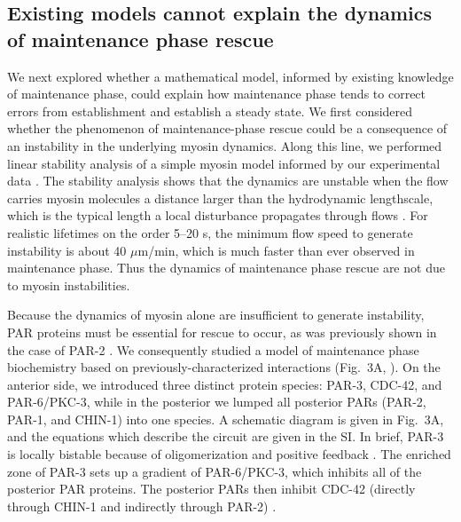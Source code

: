 \documentclass[11pt]{article}
\newcommand{\6}[1]{#1_{\text{6}}}
\newcommand{\3}[1]{#1_{\text{3}}}
\begin{document}
\subsection*{Existing models cannot explain the dynamics of maintenance phase rescue }
We next explored whether a mathematical model, informed by existing knowledge of maintenance phase, could explain how maintenance phase tends to correct errors from establishment and establish a steady state. We first considered whether the phenomenon of maintenance-phase rescue could be a consequence of an instability in the underlying myosin dynamics. Along this line, we performed linear stability analysis of a simple myosin model informed by our experimental data \citep{mayer2010anisotropies, bois2011pattern}. The stability analysis shows that the dynamics are unstable when the flow carries myosin molecules a distance larger than the hydrodynamic lengthscale, which is the typical length a local disturbance propagates through flows \citep{mayer2010anisotropies}. For realistic lifetimes on the order 5--20 s, the minimum flow speed to generate instability is about 40 $\mu$m/min, which is much faster than ever observed in maintenance phase. Thus the dynamics of maintenance phase rescue are not due to myosin instabilities.

Because the dynamics of myosin alone are insufficient to generate instability, PAR proteins must be essential for rescue to occur, as was previously shown in the case of PAR-2 \citep{zonies2010symmetry}. We consequently studied a model of maintenance phase biochemistry based on previously-characterized interactions (Fig.\ 3A, \cite{lang2017proteins}). On the anterior side, we introduced three distinct protein species: PAR-3, CDC-42, and PAR-6/PKC-3, while in the posterior we lumped all posterior PARs (PAR-2, PAR-1, and CHIN-1) into one species. A schematic diagram is given in Fig.\ 3A, and the equations which describe the circuit are given in the SI. In brief, PAR-3 is locally bistable because of oligomerization and positive feedback \citep{lang2023oligomerization}. The enriched zone of PAR-3 sets up a gradient of PAR-6/PKC-3, which inhibits all of the posterior PAR proteins. The posterior PARs then inhibit CDC-42 (directly through CHIN-1 and indirectly through PAR-2) \citep{munro2004cortical, sailer2015dynamic}. 
\end{document}
